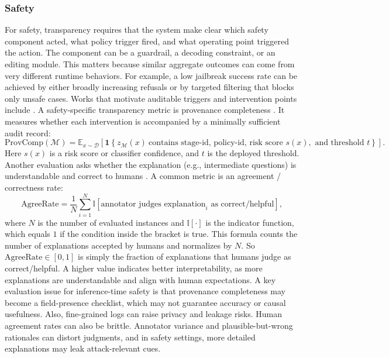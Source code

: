 \subsubsection{Safety}
For safety, transparency requires that the system make clear which safety component acted, what policy trigger fired, and what operating point triggered the action. The component can be a guardrail, a decoding constraint, or an editing module. This matters because similar aggregate outcomes can come from very different runtime behaviors. For example, a low jailbreak success rate can be achieved by either broadly increasing refusals or by targeted filtering that blocks only unsafe cases. Works that motivate auditable triggers and intervention points include \citet{li2025safetyanalyst, Liu2025GuardReasonerTR, DBLP:conf/iclr/YinLPZMVRAXW25, Kang2024R2GuardRR, Zhong2024ROSEDD}. A safety-specific transparency metric is provenance completeness \citep{song2024auditllmmultiagentcollaborationlogbased, zhou2025guardiansafeguardingllmmultiagent, Liu2025GuardReasonerTR, chen2025safeptr}. It measures whether each intervention is accompanied by a minimally sufficient audit record:
\[
\mathrm{ProvComp}(\mathcal{M})
=
\mathbb{E}_{x\sim\mathcal{D}}
\left[
\mathbf{1}\!\left\{
z_{\mathcal{M}}(x)\ \text{contains stage-id, policy-id, risk score } s(x), \text{ and threshold } t
\right\}
\right].
\]
Here $s(x)$ is a risk score or classifier confidence, and $t$ is the deployed threshold. Another evaluation asks whether the explanation (e.g., intermediate questions) is understandable and correct to humans \citep{ji2024defending, Kang2024R2GuardRR, lakara2025llmconsensusmultiagentdebatevisual}. A common metric is an agreement / correctness rate:
\[
\mathrm{AgreeRate}
=\frac{1}{N}\sum_{i=1}^{N}\mathbb{I}\!\left[\text{annotator judges explanation}_i \text{ as correct/helpful}\right], 
\]
where $N$ is the number of evaluated instances and $\mathbb{I}[\cdot]$ is the indicator function, which equals $1$ if the condition inside the bracket is true. This formula counts the number of explanations accepted by humans and normalizes by $N$.
So $\mathrm{AgreeRate}\in[0,1]$ is simply the fraction of explanations that humans judge as correct/helpful. A higher value indicates better interpretability, as more explanations are understandable and align with human expectations. A key evaluation issue for inference-time safety is that provenance completeness may become a field-presence checklist, which may not guarantee accuracy or causal usefulness. Also, fine-grained logs can raise privacy and leakage risks. Human agreement rates can also be brittle. Annotator variance and plausible-but-wrong rationales can distort judgments, and in safety settings, more detailed explanations may leak attack-relevant cues.

